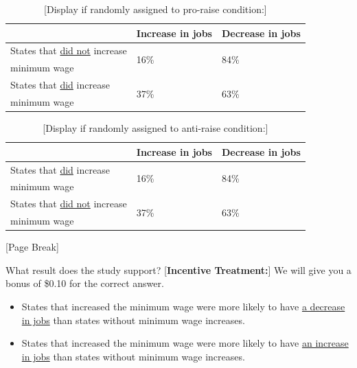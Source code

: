 \documentclass[12pt, letterpaper]{article}
\begin{document}
\begin{table}[h]
\centering
\caption*{{[}Display if randomly assigned to pro-raise condition:{]}} \label{tab:siprowage}
\begin{tabular}{|l|l|l|}
\hline 
  & Increase in jobs  & Decrease in jobs \\\hline
  States that \underline{did not} increase     & \multirow{2}{*}{16\%} & \multirow{2}{*}{84\%} \\ 
  minimum wage           &               & \\ \hline
  States that \underline{did} increase & \multirow{2}{*}{37\%} & \multirow{2}{*}{63\%} \\ 
  minimum wage           &               &  \\\hline
\end{tabular}
\end{table}

\vspace{-5mm}
\begin{table}[h]
\centering
\caption*{{[}Display if randomly assigned to anti-raise condition:{]}} \label{tab:siantiwage}
\begin{tabular}{|l|l|l|}
\hline 
  & Increase in jobs  & Decrease in jobs \\\hline
  States that \underline{did} increase     & \multirow{2}{*}{16\%} & \multirow{2}{*}{84\%} \\ 
  minimum wage           &               & \\ \hline
  States that \underline{did not} increase & \multirow{2}{*}{37\%} & \multirow{2}{*}{63\%} \\ 
  minimum wage           &               &  \\\hline
\end{tabular}
\end{table}

\vspace{-2.5mm}
\begin{center}
 {[}Page Break{]}
\end{center}

What result does the study support? {[}\textbf{Incentive Treatment:}{]} We will give you a bonus of \$0.10 for the correct answer.
\begin{itemize}
  \item States that increased the minimum wage were more likely to have \uline{a decrease in jobs} than states without minimum wage increases.
  \item States that increased the minimum wage were more likely to have \uline{an increase in jobs} than states without minimum wage increases.
\end{itemize}
\end{document}
